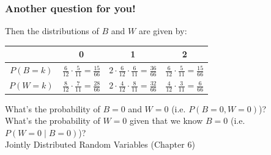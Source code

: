 \documentclass[slidestop,compress,mathserif]{beamer}
\begin{document}
\begin{frame}\frametitle{Another question for you!}

Then the distributions of $B$ and $W$ are given by:


\begin{center}
\renewcommand{\arraystretch}{2}
\begin{tabular}{c|c|c|c|}
       & 0                                           &1                                            & 2                                           \\
\hline
$P(B=k)$ & {$\frac{6}{12} \cdot\frac{5}{11} = \frac{15}{66}$}  &  {$2\cdot\frac{6}{12} \cdot\frac{6}{11} = \frac{36}{66}$} &  {$\frac{6}{12}\cdot \frac{5}{11} = \frac{15}{66}$} \\
\hline
$P(W=k)$ &{$\frac{8}{12} \cdot\frac{7}{11} = \frac{28}{66}$} &  {$2\cdot\frac{4}{12}\cdot \frac{8}{11} = \frac{32}{66}$} & {$\frac{4}{12} \cdot\frac{3}{11} = \frac{6}{66}$}  \\
\hline
\end{tabular}
\end{center}

{\footnotesize
What's the probability of $B = 0$ {\color{red}and} $W = 0$ (i.e. $P(B=0, W=0)$)? \\ \pause
What's the probability of $W=0$ {\color{red}given} that we know $B=0$ (i.e. $P(W=0 \mid B=0)$)?\\
{\color{VassarRed}Jointly Distributed Random Variables (Chapter 6)}
}


\end{frame}
\end{document}
